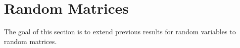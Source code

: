 \chapter{Random Matrices}

The goal of this section is to extend previous results for random variables to random matrices.
